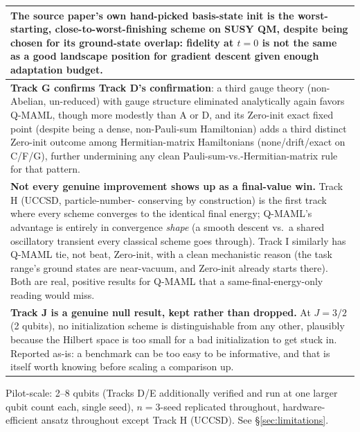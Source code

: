 \documentclass[11pt]{article}
\begin{document}
\begin{table}[ht]
\begin{tabular}{p{}}
The source paper's own hand-picked basis-state init is the worst-starting, close-to-worst-finishing scheme
on SUSY QM, despite being chosen for its ground-state overlap: fidelity at $t{=}0$ is not the same as a
good landscape position for gradient descent given enough adaptation budget. \\
\midrule
\textbf{Track G confirms Track D's confirmation}: a third gauge theory (non-Abelian, un-reduced) with
gauge structure eliminated analytically again favors Q-MAML, though more modestly than A or D, and its
Zero-init exact fixed point (despite being a dense, non-Pauli-sum Hamiltonian) adds a third distinct
Zero-init outcome among Hermitian-matrix Hamiltonians (none/drift/exact on C/F/G), further undermining any
clean Pauli-sum-vs.-Hermitian-matrix rule for that pattern. \\
\midrule
\textbf{Not every genuine improvement shows up as a final-value win.} Track H (UCCSD, particle-number-
conserving by construction) is the first track where every scheme converges to the identical final energy;
Q-MAML's advantage is entirely in convergence \emph{shape} (a smooth descent vs.\ a shared oscillatory
transient every classical scheme goes through). Track I similarly has Q-MAML tie, not beat, Zero-init, with
a clean mechanistic reason (the task range's ground states are near-vacuum, and Zero-init already starts
there). Both are real, positive results for Q-MAML that a same-final-energy-only reading would miss. \\
\midrule
\textbf{Track J is a genuine null result, kept rather than dropped.} At $J{=}3/2$ (2 qubits), no
initialization scheme is distinguishable from any other, plausibly because the Hilbert space is too small
for a bad initialization to get stuck in. Reported as-is: a benchmark can be too easy to be informative,
and that is itself worth knowing before scaling a comparison up. \\
\bottomrule
\end{tabular}
\end{table}

Pilot-scale: 2--8 qubits (Tracks D/E additionally verified and run at one larger qubit count each, single
seed), $n{=}3$-seed replicated throughout, hardware-efficient ansatz throughout except Track H (UCCSD). See
\S\ref{sec:limitations}.
\end{document}
